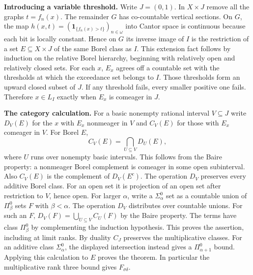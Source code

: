 \documentclass[11pt]{article}
\begin{document}
\textbf{Introducing a variable threshold.} Write \(J=(0,1)\). In \(X\times J\) remove all the graphs \(t=f_n(x)\). The remainder \(G\) has co-countable vertical sections. On \(G\), the map \(h(x,t)=(\mathbf1_{\{f_n(x)>t\}})_{n\in\omega}\) into Cantor space is continuous because each bit is locally constant. Hence on \(G\) its inverse image of \(I\) is the restriction of a set \(E\subseteq X\times J\) of the same Borel class as \(I\). This extension fact follows by induction on the relative Borel hierarchy, beginning with relatively open and relatively closed sets. For each \(x\), \(E_x\) agrees off a countable set with the thresholds at which the exceedance set belongs to \(I\). Those thresholds form an upward closed subset of \(J\). If any threshold fails, every smaller positive one fails. Therefore \(x\in L_I\) exactly when \(E_x\) is comeager in \(J\).

\textbf{The category calculation.} For a basic nonempty rational interval \(V\subseteq J\) write \(D_V(E)\) for the \(x\) with \(E_x\) nonmeager in \(V\) and \(C_V(E)\) for those with \(E_x\) comeager in \(V\). For Borel \(E\), \[ C_V(E)=\bigcap_{U\subseteq V}D_U(E), \] where \(U\) runs over nonempty basic intervals. This follows from the Baire property: a nonmeager Borel complement is comeager in some open subinterval. Also \(C_V(E)\) is the complement of \(D_V(E^c)\). The operation \(D_V\) preserves every additive Borel class. For an open set it is projection of an open set after restriction to \(V\), hence open. For larger \(\alpha\), write a \(\Sigma^0_\alpha\) set as a countable union of \(\Pi^0_\beta\) sets \(F\) with \(\beta<\alpha\). The operation \(D_V\) distributes over countable unions. For such an \(F\), \(D_V(F)=\bigcup_{U\subseteq V} C_U(F)\) by the Baire property. The terms have class \(\Pi^0_\beta\) by complementing the induction hypothesis. This proves the assertion, including at limit ranks. By duality \(C_J\) preserves the multiplicative classes. For an additive class \(\Sigma^0_\alpha\), the displayed intersection instead gives a \(\Pi^0_{\alpha+1}\) bound. Applying this calculation to \(E\) proves the theorem. In particular the multiplicative rank three bound gives \(F_{\sigma\delta}\).
\end{document}
